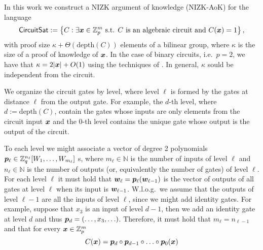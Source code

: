 
\newcommand{\setsize}{t}

In this work we construct a NIZK argument of knowledge (NIZK-AoK) for the language
\[
\mathsf{CircuitSat}:=\left\{
	C : \exists {\boldsymbol{x}}\in\mathbb{Z}_p^m \text{ s.t. } C \text{ is an algebraic circuit and } C({\boldsymbol{x}})=1
	\right\},
\]
with proof size $\kappa+\Theta(\mathrm{depth}(C))$ elements of a bilinear group, where $\kappa$ is the size of a proof of knowledge of ${\boldsymbol{x}}$. In the case of binary circuits, i.e.~$p=2$, we have that $\kappa=2|{\boldsymbol{x}}|+O(1)$ using the techniques of \cite{AC:GonHevRaf15}. In general, $\kappa$ sould be independent from the circuit.
%


We organize the circuit gates by level, where level $\ell$ is formed by the gates at distance $\ell$ from the output gate. For example, the $d$-th level, where $d:=\mathrm{depth}({C})$, contain the gates whose inputs are only elements from the circuit input ${\boldsymbol{x}}$ and the $0$-th level contains the unique gate whose output is the output of the circuit.

To each level we might associate a vector of degree 2 polynomials ${\boldsymbol{p}}_\ell \in \mathbb{Z}_q^{n_\ell}[W_1,\ldots,W_{m_\ell}]$ s, where $m_\ell\in\mathbb{N}$ is the number of inputs of level $\ell$ and $n_\ell\in\mathbb{N}$ is the number of outputs (or, equivalently the number of gates) of level $\ell$. For each level $\ell$ it must hold that ${\boldsymbol{w}}_\ell={\boldsymbol{p}}_\ell({\boldsymbol{w}}_{\ell-1})$ is the vector of outputs of all gates at level $\ell$ when its input is ${\boldsymbol{w}}_{\ell-1}$.
W.l.o.g.~we assume that the outputs of level $\ell-1$ are all the inputs of level $\ell$, since we might add identity gates. For example, suppose that $x_3$ is an input of level $d-1$, then we add an identity gate at level $d$ and thus ${\boldsymbol{p}}_d=(\ldots,x_3,\ldots)$.
 Therefore, it must hold that $ m_\ell = n_{\ell-1}$ and that for every ${\boldsymbol{x}}\in\mathbb{Z}_p^m$
$$
C({\boldsymbol{x}}) = {\boldsymbol{p}}_{d}\circ{\boldsymbol{p}}_{d-1}\circ\ldots\circ {\boldsymbol{p}}_0 ({\boldsymbol{x}})
$$

